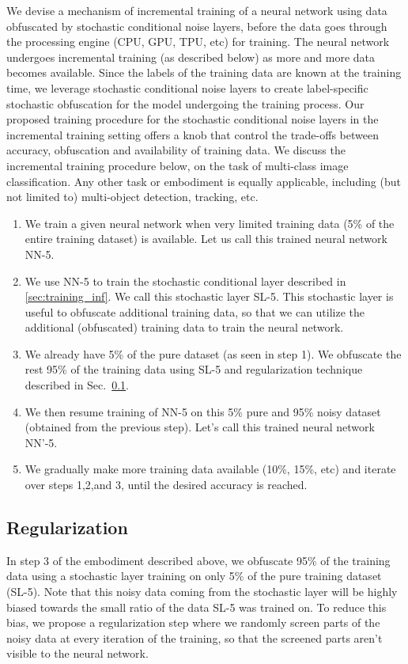 \documentclass[12pt, letterpaper]{article}
\begin{document}
We devise a mechanism of incremental training of a neural network using data obfuscated by stochastic conditional noise layers, before the data goes through the processing engine (CPU, GPU, TPU, etc) for training. The neural network undergoes incremental training (as described below) as more and more data becomes available. 
Since the labels of the training data are known at the training time, we leverage stochastic conditional noise layers to create label-specific stochastic obfuscation for the model undergoing the training process.
Our proposed training procedure for the stochastic conditional noise layers in the incremental training setting offers a knob that control the trade-offs between accuracy, obfuscation and availability of training data. We discuss the incremental training procedure below, on the task of multi-class image classification. Any other task or embodiment is equally applicable, including (but not limited to) multi-object detection, tracking, etc.

\begin{enumerate}
    \item We train a given neural network when very limited training data (5\% of the entire training dataset) is available. Let us call this trained neural network NN-5.
    \item We use NN-5 to train the stochastic conditional layer described in \ref{sec:training_inf}. We call this stochastic layer SL-5. This stochastic layer is useful to obfuscate additional training data, so that we can utilize the additional (obfuscated) training data to train the neural network.
    \item We already have 5\% of the pure dataset (as seen in step 1). We obfuscate the rest 95\% of the training data using SL-5 and regularization technique described in Sec.~\ref{sec:reg}.  
    \item We then resume training of NN-5 on this 5\% pure and 95\% noisy dataset (obtained from the previous step). Let's call this trained neural network NN’-5.
    \item We gradually make more training data available (10\%, 15\%, etc) and iterate over steps 1,2,and 3, until the desired accuracy is reached.
\end{enumerate}

\subsection{Regularization}
\label{sec:reg}
In step 3 of the embodiment described above, we obfuscate 95\% of the training data using a stochastic layer training on only 5\% of the pure training dataset (SL-5). Note that this noisy data coming from the stochastic layer will be highly biased towards the small ratio of the data SL-5 was trained on. To reduce this bias, we propose a regularization step where we randomly screen parts of the noisy data at every iteration of the training, so that the screened parts aren't visible to the neural network. 
\end{document}
